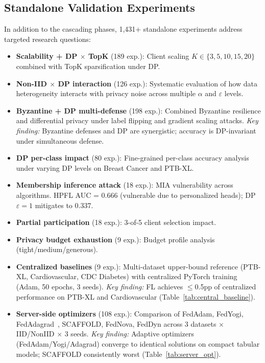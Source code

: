 \documentclass[conference,a4paper]{IEEEtran}
\begin{document}
\subsection{Standalone Validation Experiments}

In addition to the cascading phases, 1,431+ standalone experiments address targeted research questions:

\begin{itemize}
    \item \textbf{Scalability + DP $\times$ TopK} (189 exp.): Client scaling $K{\in}\{3, 5, 10, 15, 20\}$ combined with TopK sparsification under DP.
    \item \textbf{Non-IID $\times$ DP interaction} (126 exp.): Systematic evaluation of how data heterogeneity interacts with privacy noise across multiple $\alpha$ and $\varepsilon$ levels.
    \item \textbf{Byzantine + DP multi-defense} (198 exp.): Combined Byzantine resilience and differential privacy under label flipping and gradient scaling attacks. \textit{Key finding:} Byzantine defenses and DP are synergistic; accuracy is DP-invariant under simultaneous defense.
    \item \textbf{DP per-class impact} (80 exp.): Fine-grained per-class accuracy analysis under varying DP levels on Breast Cancer and PTB-XL.
    \item \textbf{Membership inference attack} (18 exp.): MIA vulnerability across algorithms. HPFL AUC = 0.666 (vulnerable due to personalized heads); DP $\varepsilon{=}1$ mitigates to 0.337.
    \item \textbf{Partial participation} (18 exp.): 3-of-5 client selection impact.
    \item \textbf{Privacy budget exhaustion} (9 exp.): Budget profile analysis (tight/medium/generous).
    \item \textbf{Centralized baselines} (9 exp.): Multi-dataset upper-bound reference (PTB-XL, Cardiovascular, CDC Diabetes) with centralized PyTorch training (Adam, 50 epochs, 3 seeds). \textit{Key finding:} FL achieves $\leq$0.5pp of centralized performance on PTB-XL and Cardiovascular (Table~\ref{tab:central_baseline}).
    \item \textbf{Server-side optimizers} (108 exp.): Comparison of FedAdam, FedYogi, FedAdagrad~\cite{reddi2021adaptive}, SCAFFOLD, FedNova, FedDyn across 3 datasets $\times$ IID/NonIID $\times$ 3 seeds. \textit{Key finding:} Adaptive optimizers (FedAdam/Yogi/Adagrad) converge to identical solutions on compact tabular models; SCAFFOLD consistently worst (Table~\ref{tab:server_opt}).

\end{itemize}
\end{document}
